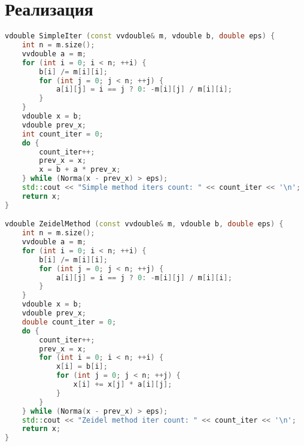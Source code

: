 \section*{Реализация}

\begin{lstlisting}[language=C++]
vdouble SimpleIter (const vvdouble& m, vdouble b, double eps) {
    int n = m.size();
    vvdouble a = m;
    for (int i = 0; i < n; ++i) {
        b[i] /= m[i][i];
        for (int j = 0; j < n; ++j) {
            a[i][j] = i == j ? 0: -m[i][j] / m[i][i]; 
        }
    }
    vdouble x = b;
    vdouble prev_x;
    int count_iter = 0;
    do {
        count_iter++;
        prev_x = x;
        x = b + a * prev_x;
    } while (Norma(x - prev_x) > eps);
    std::cout << "Simple method iters count: " << count_iter << '\n';
    return x;
}

vdouble ZeidelMethod (const vvdouble& m, vdouble b, double eps) {
    int n = m.size();
    vvdouble a = m;
    for (int i = 0; i < n; ++i) {
        b[i] /= m[i][i];
        for (int j = 0; j < n; ++j) {
            a[i][j] = i == j ? 0: -m[i][j] / m[i][i]; 
        }
    }
    vdouble x = b;
    vdouble prev_x;
    double count_iter = 0;
    do {
        count_iter++;
        prev_x = x;
        for (int i = 0; i < n; ++i) {
            x[i] = b[i];
            for (int j = 0; j < n; ++j) {
                x[i] += x[j] * a[i][j];
            }
        }
    } while (Norma(x - prev_x) > eps);
    std::cout << "Zeidel method iter count: " << count_iter << '\n';
    return x;
}
\end{lstlisting}

\pagebreak
